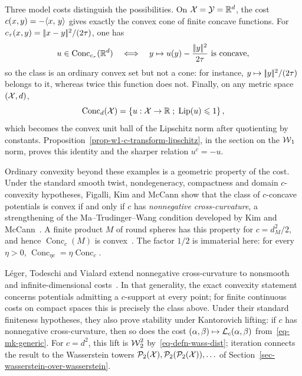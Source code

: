Three model costs distinguish the possibilities. On $\mathcal{X}=\mathcal{Y}=\mathbb{R}^d$, the cost $c(x,y)=-\langle x,\,y\rangle$ gives exactly the convex cone of finite concave functions. For
$c_\tau(x,y)=|\!| x-y |\!|^2/(2\tau)$, one has
\[
	u\in\operatorname{Conc}_{c_\tau}(\mathbb{R}^d)
	\quad\Longleftrightarrow\quad
	y\mapsto u(y)-\frac{|\!| y |\!|^2}{2\tau}\text{ is concave},
\]
so the class is an ordinary convex set but not a cone: for instance, $y\mapsto|\!| y |\!|^2/(2\tau)$ belongs to it, whereas twice this function does not. Finally, on any metric space $(\mathcal{X},d)$,
\[
	\operatorname{Conc}_d(\mathcal{X})=\left\{ u:\mathcal{X}\to\mathbb{R} \;;\; \operatorname{Lip}(u)\leqslant1 \right\},
\]
which becomes the convex unit ball of the Lipschitz norm after quotienting by constants. Proposition~\ref{prop-w1-c-transform-lipschitz}, in the section on the $\operatorname{\mathcal{W}}_1$ norm, proves this identity and the sharper relation $u^c=-u$.

Ordinary convexity beyond these examples is a geometric property of the cost. Under the standard smooth twist, nondegeneracy, compactness and domain $c$-convexity hypotheses, Figalli, Kim and McCann show that the class of $c$-concave potentials is convex if and only if $c$ has \emph{nonnegative cross-curvature}, a strengthening of the Ma--Trudinger--Wang condition developed by Kim and McCann~\cite{KimMcCann2010,FigalliKimMcCann2011}. A finite product $M$ of round spheres has this property for $c=d_M^2/2$, and hence $\operatorname{Conc}_c(M)$ is convex~\cite{KimMcCann2012,FigalliKimMcCann2013}. The factor $1/2$ is immaterial here: for every $\eta>0$, $\operatorname{Conc}_{\eta c}=\eta\operatorname{Conc}_c$.

L\'eger, Todeschi and Vialard extend nonnegative cross-curvature to nonsmooth and infinite-dimensional costs~\cite{LegerTodeschiVialard2025}. In that generality, the exact convexity statement concerns potentials admitting a $c$-support at every point; for finite continuous costs on compact spaces this is precisely the class above. Under their standard finiteness hypotheses, they also prove stability under Kantorovich lifting: if $c$ has nonnegative cross-curvature, then so does the cost $(\alpha,\beta)\mapsto\mathcal{L}_c(\alpha,\beta)$ from~\eqref{eq-mk-generic}. For $c=d^2$, this lift is $\operatorname{\mathcal{W}}_2^2$ by~\eqref{eq-defn-wass-dist}; iteration connects the result to the Wasserstein towers $\mathcal{P}_2(\mathcal{X}),\mathcal{P}_2(\mathcal{P}_2(\mathcal{X})),\ldots$ of Section~\ref{sec-wasserstein-over-wasserstein}.

